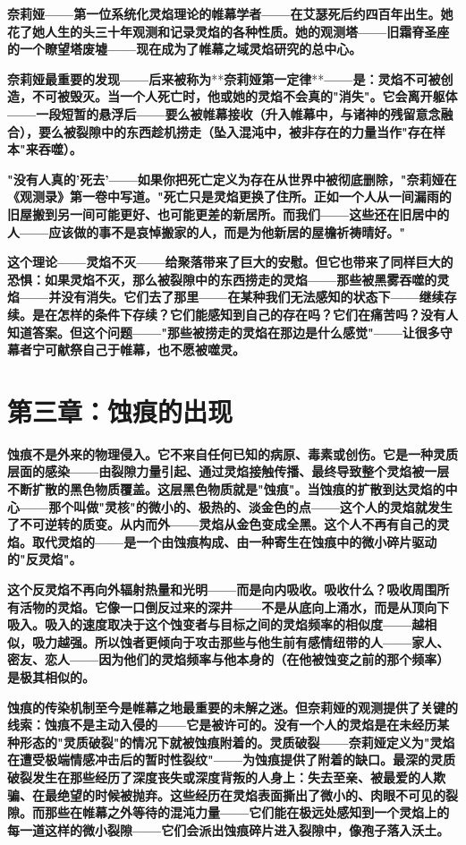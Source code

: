 \documentclass[12pt,a4paper,openany]{ctexbook}
\begin{document}
\textbf{奈莉娅——第一位系统化灵焰理论的帷幕学者——在艾瑟死后约四百年出生。她花了她人生的头三十年观测和记录灵焰的各种性质。她的观测塔——旧霜脊圣座的一个瞭望塔废墟——现在成为了帷幕之域灵焰研究的总中心。}


\textbf{奈莉娅最重要的发现——后来被称为}**\textbf{奈莉娅第一定律}**\textbf{——是：灵焰不可被创造，不可被毁灭。当一个人死亡时，他或她的灵焰不会真的"消失"。它会离开躯体——一段短暂的悬浮后——要么被帷幕接收（升入帷幕中，与诸神的残留意念融合），要么被裂隙中的东西趁机捞走（坠入混沌中，被非存在的力量当作"存在样本"来吞噬）。}


\textbf{"没有人真的'死去'——如果你把死亡定义为存在从世界中被彻底删除，"奈莉娅在《观测录》第一卷中写道。"死亡只是灵焰更换了住所。正如一个人从一间漏雨的旧屋搬到另一间可能更好、也可能更差的新居所。而我们——这些还在旧居中的人——应该做的事不是哀悼搬家的人，而是为他新居的屋檐祈祷晴好。"}


\textbf{这个理论——灵焰不灭——给聚落带来了巨大的安慰。但它也带来了同样巨大的恐惧：如果灵焰不灭，那么被裂隙中的东西捞走的灵焰——那些被黑雾吞噬的灵焰——并没有消失。它们去了那里——在某种我们无法感知的状态下——继续存续。是在怎样的条件下存续？它们能感知到自己的存在吗？它们在痛苦吗？没有人知道答案。但这个问题——"那些被捞走的灵焰在那边是什么感觉"——让很多守幕者宁可献祭自己于帷幕，也不愿被噬灵。}


\section*{第三章：蚀痕的出现}


\textbf{蚀痕不是外来的物理侵入。它不来自任何已知的病原、毒素或创伤。它是一种灵质层面的感染——由裂隙力量引起、通过灵焰接触传播、最终导致整个灵焰被一层不断扩散的黑色物质覆盖。这层黑色物质就是"蚀痕"。当蚀痕的扩散到达灵焰的中心——那个叫做"灵核"的微小的、极热的、淡金色的点——这个人的灵焰就发生了不可逆转的质变。从内而外——灵焰从金色变成全黑。这个人不再有自己的灵焰。取代灵焰的——是一个由蚀痕构成、由一种寄生在蚀痕中的微小碎片驱动的"反灵焰"。}


\textbf{这个反灵焰不再向外辐射热量和光明——而是向内吸收。吸收什么？吸收周围所有活物的灵焰。它像一口倒反过来的深井——不是从底向上涌水，而是从顶向下吸入。吸入的速度取决于这个蚀变者与目标之间的灵焰频率的相似度——越相似，吸力越强。所以蚀者更倾向于攻击那些与他生前有感情纽带的人——家人、密友、恋人——因为他们的灵焰频率与他本身的（在他被蚀变之前的那个频率）是极其相似的。}


\textbf{蚀痕的传染机制至今是帷幕之地最重要的未解之迷。但奈莉娅的观测提供了关键的线索：蚀痕不是主动入侵的——它是被许可的。没有一个人的灵焰是在未经历某种形态的"灵质破裂"的情况下就被蚀痕附着的。灵质破裂——奈莉娅定义为"灵焰在遭受极端情感冲击后的暂时性裂纹"——为蚀痕提供了附着的缺口。最深的灵质破裂发生在那些经历了深度丧失或深度背叛的人身上：失去至亲、被最爱的人欺骗、在最绝望的时候被抛弃。这些经历在灵焰表面撕出了微小的、肉眼不可见的裂隙。而那些在帷幕之外等待的混沌力量——它们能在极远处感知到一个灵焰上的每一道这样的微小裂隙——它们会派出蚀痕碎片进入裂隙中，像孢子落入沃土。}
\end{document}
